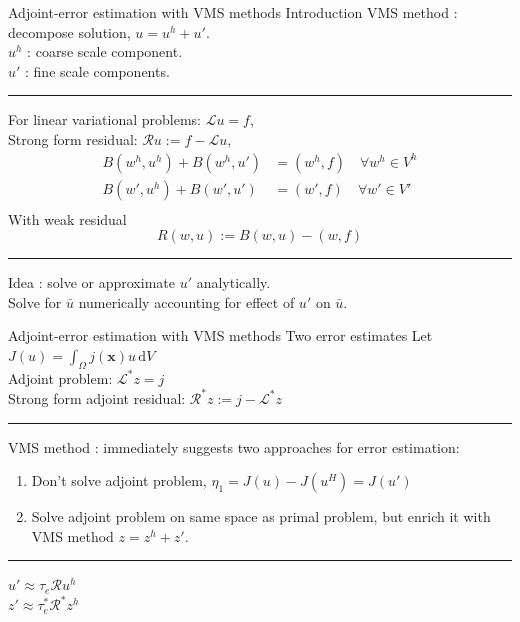 \documentclass[fleqn]{beamer}
\newcommand{\bs}[1]{\boldsymbol{#1}}
\begin{document}
\begin{frame}{Adjoint-error estimation with VMS methods}
{Introduction}
VMS method : decompose solution, $u = u^h + u'$. \\
$u^h$ : coarse scale component. \\
$u'$ : fine scale components. \\ [8pt]
\hrule
\vspace{1em}
For linear variational problems: $\mathcal{L} u  = f$, \\
Strong form residual: $\mathcal{R} u := f - \mathcal{L} u$,
%
\begin{equation*}
\begin{aligned}
B(w^h, u^h) + B(w^h, u') &= (w^h, f) \quad \forall w^h \in V^h \\
B(w', u^h) + B(w', u') &= (w', f) \quad \forall w' \in V' \\
\end{aligned}
\end{equation*}
With weak residual
\begin{equation*}
R(w, u) := B(w, u) - (w, f)
\end{equation*}
\hrule
\vspace{1em}
Idea : solve or approximate $u'$ analytically. \\
Solve for $\bar{u}$ numerically accounting for effect of $u'$
on $\bar{u}.$
\end{frame}


\begin{frame}{Adjoint-error estimation with VMS methods}
{Two error estimates}
Let $J(u) = \int_{\Omega} j(\bs{x}) u \, \text{d} V$ \\
Adjoint problem: $\mathcal{L}^* z = j$ \\
Strong form adjoint residual: $\mathcal{R}^*z := j - \mathcal{L}^*z$ \\ [8pt]
\hrule
\vspace{1em}
VMS method : immediately suggests two approaches for error estimation:
\begin{enumerate}
\item Don't solve adjoint problem, $\eta_1 = J(u) - J(u^H) = J(u')$
\item Solve adjoint problem on same space as primal problem,
but enrich it with VMS method $z = z^h + z'$.
\end{enumerate}
\vspace{0.5em}
\hrule
\vspace{1em}
$u' \approx \tau_e \mathcal{R} u^h$ \\
$z' \approx \tau^*_e \mathcal{R}^* z^h$ \\
\end{frame}
\end{document}
